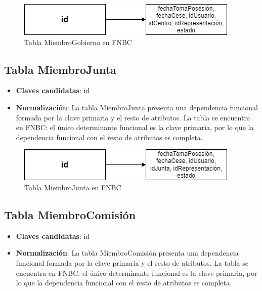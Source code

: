 \begin{figure}[H]
\centering
\includegraphics[scale=0.75]{img/diagramas/Datos/FNBC-MiembroGobierno.png}
\caption{Tabla MiembroGobierno en FNBC}\label{fig:Tabla MiembroGobierno en FNBC}   
\end{figure}

\subsection{Tabla MiembroJunta}
    \begin{itemize}
        \item \textbf{Claves candidatas}: id
        \item \textbf{Normalización}: La tabla MiembroJunta presenta una dependencia funcional formada por la clave primaria y el resto de atributos. La tabla se encuentra en FNBC: el único determinante funcional es la clave primaria, por lo que la dependencia funcional con el resto de atributos es completa.
    \end{itemize}

\begin{figure}[H]
\centering
\includegraphics[scale=0.75]{img/diagramas/Datos/FNBC-MiembroJunta.png}
\caption{Tabla MiembroJunta en FNBC}\label{fig:Tabla MiembroJunta en FNBC}   
\end{figure}

\subsection{Tabla MiembroComisión}
    \begin{itemize}
        \item \textbf{Claves candidatas}: id
        \item \textbf{Normalización}: La tabla MiembroComisión presenta una dependencia funcional formada por la clave primaria y el resto de atributos. La tabla se encuentra en FNBC: el único determinante funcional es la clave primaria, por lo que la dependencia funcional con el resto de atributos es completa.
    \end{itemize}

